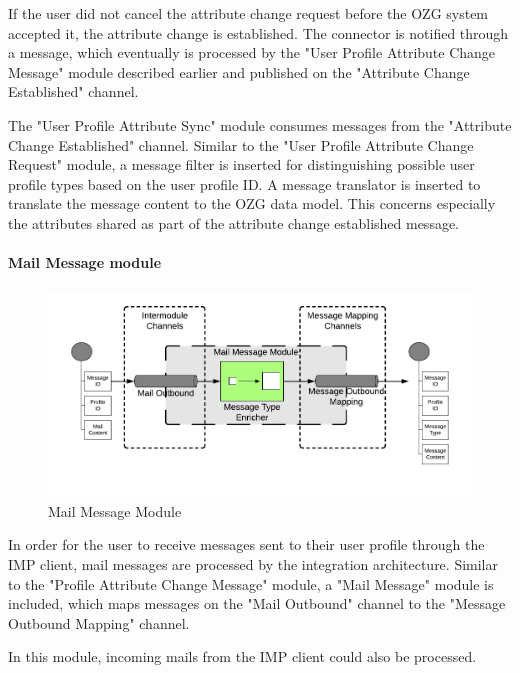 If the user did not cancel the attribute change request before the OZG system accepted it, the attribute change is established. The connector is notified through a message, which eventually is processed by the "User Profile Attribute Change Message" module described earlier and published on the "Attribute Change Established" channel.

The "User Profile Attribute Sync" module consumes messages from the "Attribute Change Established" channel. Similar to the "User Profile Attribute Change Request" module, a message filter is inserted for distinguishing possible user profile types based on the user profile ID. A message translator is inserted to translate the message content to the OZG data model. This concerns especially the attributes shared as part of the attribute change established message.

\paragraph{Mail Message module}

\begin{figure}[h!]
    \centering
    \includegraphics[scale=0.6]{Diagrams/Integration Architecture 1/Technological Integration/14. Mail Message Module.pdf}
    \caption{Mail Message Module}
    \label{integration1:mail_message_module}
\end{figure}

In order for the user to receive messages sent to their user profile through the IMP client, mail messages are processed by the integration architecture. Similar to the "Profile Attribute Change Message" module, a "Mail Message" module is included, which maps messages on the "Mail Outbound" channel to the "Message Outbound Mapping" channel.

In this module, incoming mails from the IMP client could also be processed.

